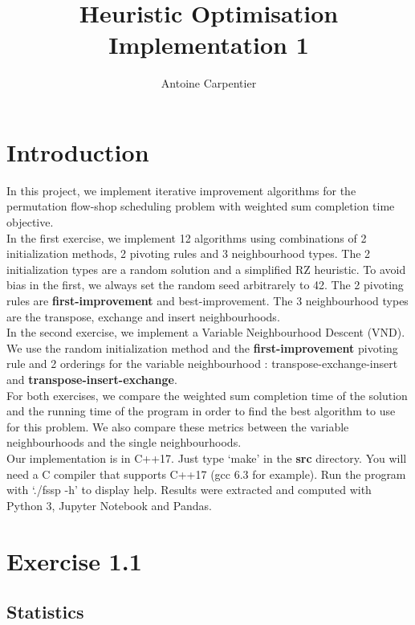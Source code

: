 \documentclass[a4paper,10pt]{article}
\title{Heuristic Optimisation\\Implementation 1}
\author{Antoine Carpentier}
\begin{document}
\maketitle

\section{Introduction}

In this project, we implement iterative improvement algorithms for the permutation flow-shop scheduling problem with weighted sum completion time objective. \\

In the first exercise, we implement 12 algorithms using combinations of 2 initialization methods, 2 pivoting rules and 3 neighbourhood types. The 2 initialization types are a random solution and a simplified RZ heuristic. To avoid bias in the first, we always set the random seed arbitrarely to 42. The 2 pivoting rules are \textbf{first-improvement} and best-improvement. The 3 neighbourhood types are the transpose, exchange and insert neighbourhoods. \\

In the second exercise, we implement a Variable Neighbourhood Descent (VND). We use the random initialization method and the \textbf{first-improvement} pivoting rule and 2 orderings for the variable neighbourhood : transpose-exchange-insert and \textbf{transpose-insert-exchange}. \\

For both exercises, we compare the weighted sum completion time of the solution and the running time of the program in order to find the best algorithm to use for this problem. We also compare these metrics between the variable neighbourhoods and the single neighbourhoods. \\

Our implementation is in C++17. Just type `make' in the \textbf{src} directory. You will need a C compiler that supports C++17 (gcc 6.3 for example). Run the program with `./fssp -h' to display help. Results were extracted and computed with Python 3, Jupyter Notebook and Pandas.

\section{Exercise 1.1}

\subsection{Statistics}
\end{document}
